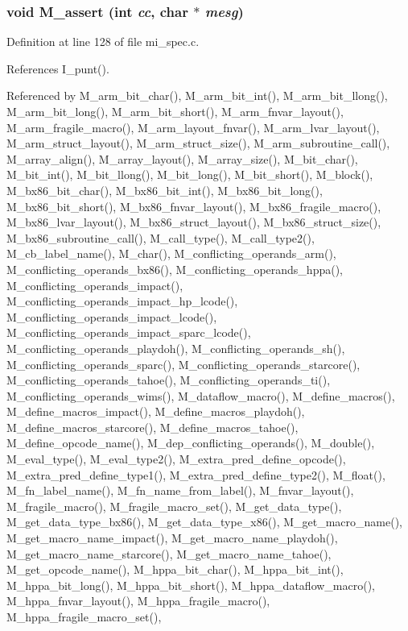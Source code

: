 \subsubsection{\setlength{\rightskip}{0pt plus 5cm}void M\_\-assert (int {\em cc}, char $\ast$ {\em mesg})}\label{mi__spec_8c_0d060bd976a60ed896a914b0cb1d1601}




Definition at line 128 of file mi\_\-spec.c.

References I\_\-punt().

Referenced by M\_\-arm\_\-bit\_\-char(), M\_\-arm\_\-bit\_\-int(), M\_\-arm\_\-bit\_\-llong(), M\_\-arm\_\-bit\_\-long(), M\_\-arm\_\-bit\_\-short(), M\_\-arm\_\-fnvar\_\-layout(), M\_\-arm\_\-fragile\_\-macro(), M\_\-arm\_\-layout\_\-fnvar(), M\_\-arm\_\-lvar\_\-layout(), M\_\-arm\_\-struct\_\-layout(), M\_\-arm\_\-struct\_\-size(), M\_\-arm\_\-subroutine\_\-call(), M\_\-array\_\-align(), M\_\-array\_\-layout(), M\_\-array\_\-size(), M\_\-bit\_\-char(), M\_\-bit\_\-int(), M\_\-bit\_\-llong(), M\_\-bit\_\-long(), M\_\-bit\_\-short(), M\_\-block(), M\_\-bx86\_\-bit\_\-char(), M\_\-bx86\_\-bit\_\-int(), M\_\-bx86\_\-bit\_\-long(), M\_\-bx86\_\-bit\_\-short(), M\_\-bx86\_\-fnvar\_\-layout(), M\_\-bx86\_\-fragile\_\-macro(), M\_\-bx86\_\-lvar\_\-layout(), M\_\-bx86\_\-struct\_\-layout(), M\_\-bx86\_\-struct\_\-size(), M\_\-bx86\_\-subroutine\_\-call(), M\_\-call\_\-type(), M\_\-call\_\-type2(), M\_\-cb\_\-label\_\-name(), M\_\-char(), M\_\-conflicting\_\-operands\_\-arm(), M\_\-conflicting\_\-operands\_\-bx86(), M\_\-conflicting\_\-operands\_\-hppa(), M\_\-conflicting\_\-operands\_\-impact(), M\_\-conflicting\_\-operands\_\-impact\_\-hp\_\-lcode(), M\_\-conflicting\_\-operands\_\-impact\_\-lcode(), M\_\-conflicting\_\-operands\_\-impact\_\-sparc\_\-lcode(), M\_\-conflicting\_\-operands\_\-playdoh(), M\_\-conflicting\_\-operands\_\-sh(), M\_\-conflicting\_\-operands\_\-sparc(), M\_\-conflicting\_\-operands\_\-starcore(), M\_\-conflicting\_\-operands\_\-tahoe(), M\_\-conflicting\_\-operands\_\-ti(), M\_\-conflicting\_\-operands\_\-wims(), M\_\-dataflow\_\-macro(), M\_\-define\_\-macros(), M\_\-define\_\-macros\_\-impact(), M\_\-define\_\-macros\_\-playdoh(), M\_\-define\_\-macros\_\-starcore(), M\_\-define\_\-macros\_\-tahoe(), M\_\-define\_\-opcode\_\-name(), M\_\-dep\_\-conflicting\_\-operands(), M\_\-double(), M\_\-eval\_\-type(), M\_\-eval\_\-type2(), M\_\-extra\_\-pred\_\-define\_\-opcode(), M\_\-extra\_\-pred\_\-define\_\-type1(), M\_\-extra\_\-pred\_\-define\_\-type2(), M\_\-float(), M\_\-fn\_\-label\_\-name(), M\_\-fn\_\-name\_\-from\_\-label(), M\_\-fnvar\_\-layout(), M\_\-fragile\_\-macro(), M\_\-fragile\_\-macro\_\-set(), M\_\-get\_\-data\_\-type(), M\_\-get\_\-data\_\-type\_\-bx86(), M\_\-get\_\-data\_\-type\_\-x86(), M\_\-get\_\-macro\_\-name(), M\_\-get\_\-macro\_\-name\_\-impact(), M\_\-get\_\-macro\_\-name\_\-playdoh(), M\_\-get\_\-macro\_\-name\_\-starcore(), M\_\-get\_\-macro\_\-name\_\-tahoe(), M\_\-get\_\-opcode\_\-name(), M\_\-hppa\_\-bit\_\-char(), M\_\-hppa\_\-bit\_\-int(), M\_\-hppa\_\-bit\_\-long(), M\_\-hppa\_\-bit\_\-short(), M\_\-hppa\_\-dataflow\_\-macro(), M\_\-hppa\_\-fnvar\_\-layout(), M\_\-hppa\_\-fragile\_\-macro(), M\_\-hppa\_\-fragile\_\-macro\_\-set(), 